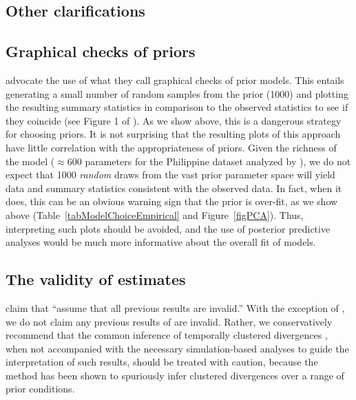\documentclass[letterpaper,12pt]{article}
\begin{document}
\begin{linenumbers}
\section*{Other clarifications}

\subsection*{Graphical checks of priors}
\citet{Hickerson2013} advocate the use of what they call graphical checks of
prior models.
This entails generating a small number of random samples from the prior (1000)
and plotting the resulting summary statistics in comparison to the observed
statistics to see if they coincide (see Figure 1 of \citet{Hickerson2013}).
As we show above, this is a dangerous strategy for choosing priors.
It is not surprising that the resulting plots of this approach have little
correlation with the appropriateness of priors.
Given the richness of the \msb model ($\approx 600$ parameters for the Philippine
dataset analyzed by \citet{Hickerson2013}), we do not expect that 1000
\emph{random} draws from the vast prior parameter space will yield data and
summary statistics consistent with the observed data.
In fact, when it does, this can be an obvious warning sign that the prior is
over-fit, as we show above (Table~\ref{tabModelChoiceEmpirical} and
Figure~\ref{figPCA}).
Thus, interpreting such plots should be avoided, and the use of posterior
predictive analyses would be much more informative about the overall fit of
models.

\subsection*{The validity of \msb estimates}
\citet{Hickerson2013} claim that \citet{Oaks2012} ``assume that all previous
\msb results are invalid.''
With the exception of \citet{Hickerson2013}, we do not claim any previous
results of \msb are invalid.
Rather, we conservatively recommend that the common inference of temporally
clustered divergences
\citep{Barber2010, Bell2012, Carnaval2009, Chan2011, Daza2010, Hickerson2006,
    Huang2011, Lawson2010, Leache2007, Plouviez2009, Stone2012, Voje2009},
when not accompanied with the necessary simulation-based analyses to guide the
interpretation of such results, should be treated with caution, because the
method has been shown to spuriously infer clustered divergences over a range of
prior conditions.


\end{linenumbers}
\end{document}
